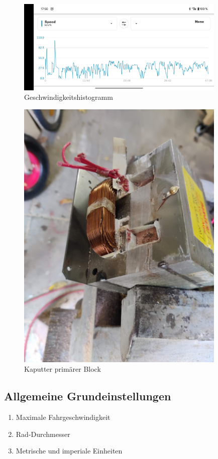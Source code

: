 \begin{figure}[h]
    \centering
    \includegraphics[width=10cm]{images/Geschwindigkeitshistogramm}
    \caption{Geschwindigkeitshistogramm\cite{lorenz_scherrer_selbst_2023}}
    \label{fig:34}
\end{figure}

\begin{figure}[h]
    \centering
    \includegraphics[width=10cm]{images/KaputterTransformator}
    \caption{Kaputter primärer Block\cite{lorenz_scherrer_selbst_2023}}
    \label{fig:35}
\end{figure}

\subsection*{Allgemeine Grundeinstellungen}\label{sec:parameter}
\begin{enumerate}[label=\arabic*.]
    \item Maximale Fahrgeschwindigkeit
    \item Rad-Durchmesser
    \item Metrische und imperiale Einheiten
\end{enumerate}


